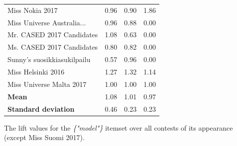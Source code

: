 \documentclass[english]{tktltiki}
\begin{document}
\begin{table}[H]
\begin{adjustbox}{width=1\textwidth}
\begin{tabular}{lccc}
                                   Miss Nokia 2017 &  0.96 &  0.90 &    1.86 \\
                        Miss Universe Australia... &  0.96 &  0.88 &    0.00 \\
                         Mr. CASED 2017 Candidates &  1.08 &  0.63 &    0.00 \\
                         Ms. CASED 2017 Candidates &  0.80 &  0.82 &    0.00 \\
                       Sunny's suosikkiasukilpailu &  0.57 &  0.96 &    0.00 \\
                                Miss Helsinki 2016 &  1.27 &  1.32 &    1.14 \\
                          Miss Universe Malta 2017 &  1.00 &  1.00 &    1.00 \\
        \bottomrule
        \textbf{Mean} & 1.08 & 1.01 & 0.97 \\
        \textbf{Standard deviation} & 0.46 & 0.23 & 0.23
    \end{tabular}
    \end{adjustbox}
    The lift values for the \emph{\{"model"\}} itemset over all contests of its appearance (except Miss Suomi 2017).
\end{table}
\end{document}
